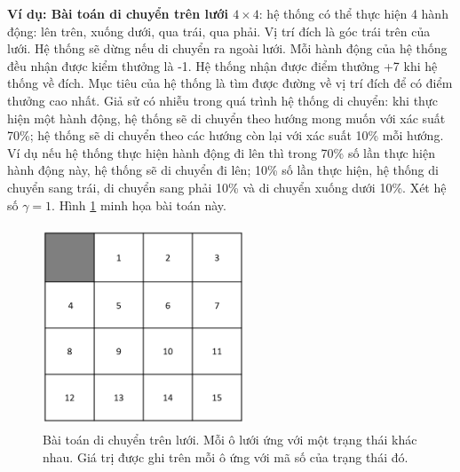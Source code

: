 \textbf{Ví dụ: Bài toán di chuyển trên lưới $4 \times 4$}: hệ thống có thể thực hiện 4 hành động: lên trên, xuống dưới, qua trái, qua phải. 
Vị trí đích là góc trái trên của lưới. 
Hệ thống sẽ dừng nếu di chuyển ra ngoài lưới. 
Mỗi hành động của hệ thống đều nhận được kiểm thưởng là -1. 
Hệ thống nhận được điểm thưởng +7 khi hệ thống về đích. 
Mục tiêu của hệ thống là tìm được đường về vị trí đích để có điểm thưởng cao nhất.
Giả sử có nhiễu trong quá trình hệ thống di chuyển: khi thực hiện một hành động, hệ thống sẽ di chuyển theo hướng mong muốn với xác suất 70\%; hệ thống sẽ di chuyển theo các hướng còn lại với xác suất 10\% mỗi hướng.
Ví dụ nếu hệ thống thực hiện hành động đi lên thì trong 70\% số lần thực hiện hành động này, hệ thống sẽ di chuyển đi lên; 10\% số lần thực hiện, hệ thống di chuyển sang trái, di chuyển sang phải 10\% và di chuyển xuống dưới 10\%. 
Xét hệ số $\gamma = 1$. 
Hình \ref{grid_problem} minh họa bài toán này.
\begin{figure}
	\centering
	\includegraphics[width=60mm, height =60mm]{baitoan}
	\caption[Bài toán di chuyển trên lưới]{Bài toán di chuyển trên lưới.
	Mỗi ô lưới ứng với một trạng thái khác nhau.
	Giá trị được ghi trên mỗi ô ứng với mã số của trạng thái đó.}
	\label{grid_problem}
\end{figure}

